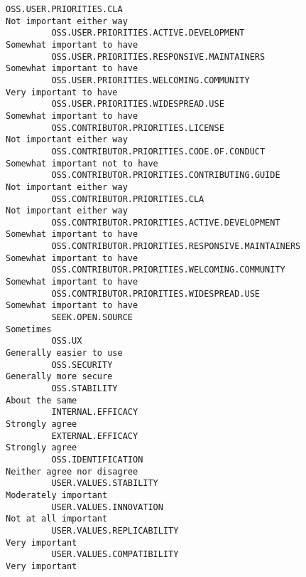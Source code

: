 \documentclass[11pt]{article}
\begin{document}
\begin{Verbatim}[commandchars=\\\{\}]
         OSS.USER.PRIORITIES.CLA                                                     Not important either way   
         OSS.USER.PRIORITIES.ACTIVE.DEVELOPMENT                                    Somewhat important to have   
         OSS.USER.PRIORITIES.RESPONSIVE.MAINTAINERS                                Somewhat important to have   
         OSS.USER.PRIORITIES.WELCOMING.COMMUNITY                                       Very important to have   
         OSS.USER.PRIORITIES.WIDESPREAD.USE                                        Somewhat important to have   
         OSS.CONTRIBUTOR.PRIORITIES.LICENSE                                          Not important either way   
         OSS.CONTRIBUTOR.PRIORITIES.CODE.OF.CONDUCT                            Somewhat important not to have   
         OSS.CONTRIBUTOR.PRIORITIES.CONTRIBUTING.GUIDE                               Not important either way   
         OSS.CONTRIBUTOR.PRIORITIES.CLA                                              Not important either way   
         OSS.CONTRIBUTOR.PRIORITIES.ACTIVE.DEVELOPMENT                             Somewhat important to have   
         OSS.CONTRIBUTOR.PRIORITIES.RESPONSIVE.MAINTAINERS                         Somewhat important to have   
         OSS.CONTRIBUTOR.PRIORITIES.WELCOMING.COMMUNITY                            Somewhat important to have   
         OSS.CONTRIBUTOR.PRIORITIES.WIDESPREAD.USE                                 Somewhat important to have   
         SEEK.OPEN.SOURCE                                                                           Sometimes   
         OSS.UX                                                                       Generally easier to use   
         OSS.SECURITY                                                                   Generally more secure   
         OSS.STABILITY                                                                         About the same   
         INTERNAL.EFFICACY                                                                     Strongly agree   
         EXTERNAL.EFFICACY                                                                     Strongly agree   
         OSS.IDENTIFICATION                                                        Neither agree nor disagree   
         USER.VALUES.STABILITY                                                           Moderately important   
         USER.VALUES.INNOVATION                                                          Not at all important   
         USER.VALUES.REPLICABILITY                                                             Very important   
         USER.VALUES.COMPATIBILITY                                                             Very important   

\end{Verbatim}
\end{document}
